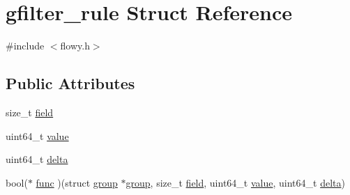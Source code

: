\hypertarget{structgfilter__rule}{\section{gfilter\-\_\-rule \-Struct \-Reference}
\label{structgfilter__rule}
}


{\ttfamily \#include $<$flowy.\-h$>$}

\subsection*{\-Public \-Attributes}
\begin{DoxyCompactItemize}
\item 
size\-\_\-t \hyperlink{structgfilter__rule_aca87db908ffde91cbf51b2e640738ce1}{field}
\item 
uint64\-\_\-t \hyperlink{structgfilter__rule_a535d5fcb689e8998a09022bc0dd106b4}{value}
\item 
uint64\-\_\-t \hyperlink{structgfilter__rule_ae47654d128d6875cd1e209bdada7612e}{delta}
\item 
bool($\ast$ \hyperlink{structgfilter__rule_a7ae6e6b2e4d4a6398b1a035577ee583a}{func} )(struct \hyperlink{structgroup}{group} $\ast$\hyperlink{structgroup}{group}, size\-\_\-t \hyperlink{structgfilter__rule_aca87db908ffde91cbf51b2e640738ce1}{field}, uint64\-\_\-t \hyperlink{structgfilter__rule_a535d5fcb689e8998a09022bc0dd106b4}{value}, uint64\-\_\-t \hyperlink{structgfilter__rule_ae47654d128d6875cd1e209bdada7612e}{delta})
\end{DoxyCompactItemize}


